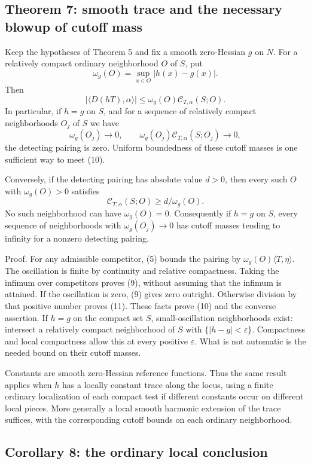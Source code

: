 \documentclass[11pt]{article}
\begin{document}
\subsection{Theorem 7: smooth trace and the necessary blowup of cutoff mass}

Keep the hypotheses of Theorem 5 and fix a smooth zero-Hessian \(g\) on \(N\). For a relatively compact ordinary neighborhood \(O\) of \(S\), put
\[
 \omega_g(O)=\sup_{x\in O}|h(x)-g(x)|.
\]
Then
\[
 |\langle D(hT),\alpha\rangle|
 \leq\omega_g(O)\mathcal C_{T,\alpha}(S;O).\tag{9}
\]
In particular, if \(h=g\) on \(S\), and for a sequence of relatively compact neighborhoods \(O_j\) of \(S\) we have
\[
 \omega_g(O_j)\to0,
 \qquad\omega_g(O_j)\mathcal C_{T,\alpha}(S;O_j)\to0,\tag{10}
\]
the detecting pairing is zero. Uniform boundedness of these cutoff masses is one sufficient way to meet (10).

Conversely, if the detecting pairing has absolute value \(d>0\), then every such \(O\) with \(\omega_g(O)>0\) satisfies
\[
 \mathcal C_{T,\alpha}(S;O)\geq d/\omega_g(O).\tag{11}
\]
No such neighborhood can have \(\omega_g(O)=0\). Consequently if \(h=g\) on \(S\), every sequence of neighborhoods with \(\omega_g(O_j)\to0\) has cutoff masses tending to infinity for a nonzero detecting pairing.

Proof. For any admissible competitor, (5) bounds the pairing by \(\omega_g(O)\langle T,\eta\rangle\). The oscillation is finite by continuity and relative compactness. Taking the infimum over competitors proves (9), without assuming that the infimum is attained. If the oscillation is zero, (9) gives zero outright. Otherwise division by that positive number proves (11). These facts prove (10) and the converse assertion. If \(h=g\) on the compact set \(S\), small-oscillation neighborhoods exist: intersect a relatively compact neighborhood of \(S\) with \(\{|h-g|<\varepsilon\}\). Compactness and local compactness allow this at every positive \(\varepsilon\). What is not automatic is the needed bound on their cutoff masses.

Constants are smooth zero-Hessian reference functions. Thus the same result applies when \(h\) has a locally constant trace along the locus, using a finite ordinary localization of each compact test if different constants occur on different local pieces. More generally a local smooth harmonic extension of the trace suffices, with the corresponding cutoff bounds on each ordinary neighborhood.

\subsection{Corollary 8: the ordinary local conclusion}
\end{document}
